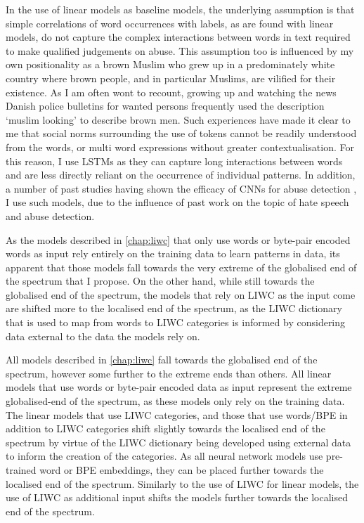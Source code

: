 In the use of linear models as baseline models, the underlying assumption is that simple correlations of word occurrences with labels, as are found with linear models, do not capture the complex interactions between words in text required to make qualified judgements on abuse. This assumption too is influenced by my own positionality as a brown Muslim who grew up in a predominately white country where brown people, and in particular Muslims, are vilified for their existence. As I am often wont to recount, growing up and watching the news Danish police bulletins for wanted persons frequently used the description `muslim looking' to describe brown men. Such experiences have made it clear to me that social norms surrounding the use of tokens cannot be readily understood from the words, or multi word expressions without greater contextualisation. For this reason, I use LSTMs as they can capture long interactions between words and are less directly reliant on the occurrence of individual patterns. In addition, a number of past studies having shown the efficacy of CNNs for abuse detection \citep{Park:2017, Mitchell:2019,Kolhatkar:2020,Rizwan:2020,Safaya:2020,Gamback:2017}, I use such models, due to the influence of past work on the topic of hate speech and abuse detection.

As the models described in \autoref{chap:liwc} that only use words or byte-pair encoded words as input rely entirely on the training data to learn patterns in data, its apparent that those models fall towards the very extreme of the globalised end of the spectrum that I propose. On the other hand, while still towards the globalised end of the spectrum, the models that rely on LIWC as the input come are shifted more to the localised end of the spectrum, as the LIWC dictionary that is used to map from words to LIWC categories is informed by considering data external to the data the models rely on.

{\color{green!80!black}
All models described in \autoref{chap:liwc} fall towards the globalised end of the spectrum, however some further to the extreme ends than others. All linear models that use words or byte-pair encoded data as input represent the extreme globalised-end of the spectrum, as these models only rely on the training data. The linear models that use LIWC categories, and those that use words/BPE in addition to LIWC categories shift slightly towards the localised end of the spectrum by virtue of the LIWC dictionary being developed using external data to inform the creation of the categories.
As all neural network models use pre-trained word or BPE embeddings, they can be placed further towards the localised end of the spectrum. Similarly to the use of LIWC for linear models, the use of LIWC as additional input shifts the models further towards the localised end of the spectrum.
}

